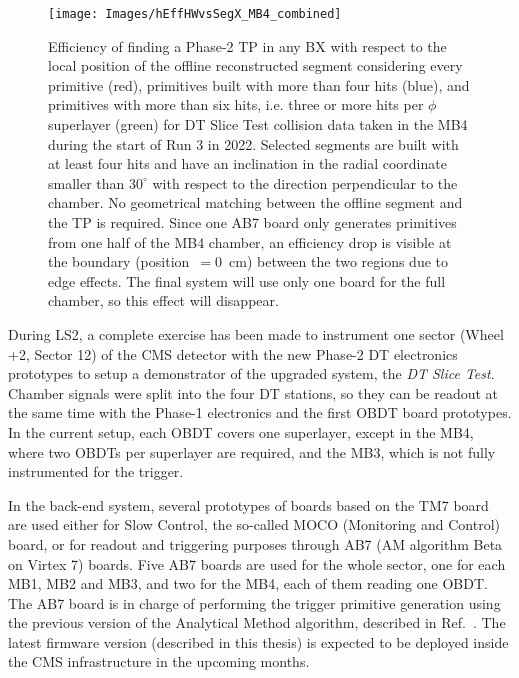 \documentclass[../main.tex]{subfiles}
\begin{document}
\begin{figure}[b!]
\begin{center}
\texttt{[image: Images/hEffHWvsSegX\_MB4\_combined]}
\end{center}
\caption[Algorithm efficiency in the Slice Test]{Efficiency of finding a Phase-2 TP in any BX with respect to the local position of the offline reconstructed segment considering every primitive (red), primitives built with more than four hits (blue), and primitives with more than six hits, i.e. three or more hits per $\phi$ superlayer (green) for DT Slice Test collision data taken in the MB4 during the start of Run 3 in 2022. Selected segments are built with at least four hits and have an inclination in the radial coordinate smaller than $30^\circ$ with respect to the direction perpendicular to the chamber. No geometrical matching between the offline segment and the TP is required. Since one AB7 board only generates primitives from one half of the MB4 chamber, an efficiency drop is visible at the boundary (position~$=0$~cm) between the two regions due to edge effects. The final system will use only one board for the full chamber, so this effect will disappear.}
\label{dts:fig:st_eff}
\end{figure}

During LS2, a complete exercise has been made to instrument one sector (Wheel +2, Sector 12) of the CMS detector with the new Phase-2 DT electronics prototypes to setup a demonstrator of the upgraded system, the \textit{DT Slice Test}. Chamber signals were split into the four DT stations, so they can be readout at the same time with the Phase-1 electronics and the first OBDT board prototypes. In the current setup, each OBDT covers one superlayer, except in the MB4, where two OBDTs per superlayer are required, and the MB3, which is not fully instrumented for the trigger. %

In the back-end system, several prototypes of boards based on the TM7 board \cite{dts:intro:barrel_upgrade} are used either for Slow Control, the so-called MOCO (Monitoring and Control) board, or for readout and triggering purposes through AB7 (AM algorithm Beta on Virtex 7) boards. Five AB7 boards are used for the whole sector, one for each MB1, MB2 and MB3, and two for the MB4, each of them reading one OBDT. The AB7 board is in charge of performing the trigger primitive generation using the previous version of the Analytical Method algorithm, described in Ref.~\cite{dts:intro:am}. The latest firmware version (described in this thesis) is expected to be deployed inside the CMS infrastructure in the upcoming months.
\end{document}
